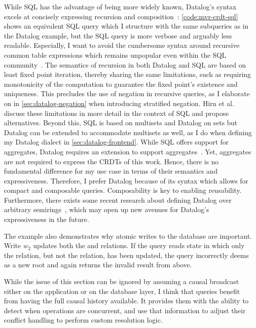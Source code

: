 While SQL has the advantage of being more widely known,
Datalog's syntax excels at concisely expressing recursion and
composition~\cite{abo2024convergence}:
\ref{code:mvr-crdt-sql} shows an equivalent SQL query which I structure
with the same subqueries as in the Datalog example,
but the SQL query is more verbose and arguably less readable.
Especially, I want to avoid the cumbersome syntax around recursive
common table expressions which remains unpopular even within the SQL
community~\cite{neumann2024critique, hirn2023fix, mcsherry2022recursion}.
The semantics of recursion in both Datalog and SQL are based on least
fixed point iteration, thereby sharing the same limitations, such as requiring
monotonicity of the computation to guarantee the fixed point's existence
and uniqueness. This precludes the use of negation in recursive queries,
as I elaborate on in \ref{sec:datalog-negation} when introducing stratified
negation.
Hirn et al. \cite{hirn2023fix} discuss these limitations in more detail
in the context of SQL and propose alternatives.
Beyond this, SQL is based on multisets and Datalog on sets but Datalog can
be extended to accommodate multisets as well, as I do when defining
my Datalog dialect in \ref{sec:datalog-frontend}.
While SQL offers support for aggregates,
Datalog requires an extension to support aggregates~\cite{green2013datalog}.
Yet, aggregates are not required to express the \acp{CRDT} of this work.
Hence, there is no fundamental difference for my use case
in terms of their semantics and expressiveness.
Therefore, I prefer Datalog because of its syntax which allows for compact
and composable queries. Composability is key to enabling reusability.
Furthermore, there exists some recent research about defining Datalog
over arbitrary semirings~\cite{abo2024convergence, khamis2022datalog},
which may open up new avenues for Datalog's expressiveness in the future.

The example also demonstrates why atomic writes to the database are important.
Write \(w_2\) updates both the  and  relations.
If the query reads state in which only the  relation,
but not the  relation, has been updated,
the query incorrectly deems  as a new root and
again returns the invalid result from above.

While the issue of this section can be ignored by assuming a causal broadcast
either on the application or on the database layer,
I think that queries benefit from having the full causal history available.
It provides them with the ability to detect when operations are concurrent,
and use that information to adjust their conflict handling to perform
custom resolution logic.

